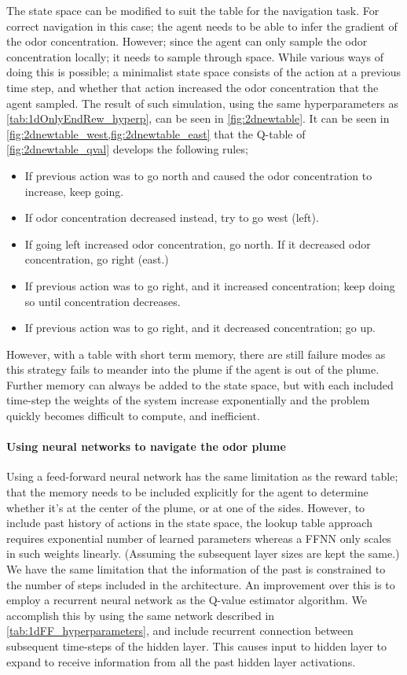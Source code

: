 \documentclass[../dissertation.tex]{subfiles}
\begin{document}
The state space can be modified to suit the table for the navigation task.
For correct navigation in this case; the agent needs to be able to infer the gradient of the odor concentration.
However; since the agent can only sample the odor concentration locally; it needs to sample through space.
While various ways of doing this is possible; a minimalist state space consists of the action at a previous time step, and whether that action increased the odor concentration that the agent sampled.
The result of such simulation, using the same hyperparameters as \cref{tab:1dOnlyEndRew_hyperp}, can be seen in \cref{fig:2dnewtable}.
It can be seen in \cref{fig:2dnewtable_west,fig:2dnewtable_east} that the Q-table of \cref{fig:2dnewtable_qval} develops the following rules;

\begin{itemize}
    \item If previous action was to go north and caused the odor concentration to increase, keep going.
    \item If odor concentration decreased instead, try to go west (left).
    \item If going left increased odor concentration, go north. If it decreased odor concentration, go right (east.)
    \item If previous action was to go right, and it increased concentration; keep doing so until concentration decreases.
    \item If previous action was to go right, and it decreased concentration; go up.
\end{itemize}

However, with a table with short term memory, there are still failure modes as this strategy fails to meander into the plume if the agent is out of the plume.
Further memory can always be added to the state space, but with each included time-step the weights of the system increase exponentially and the problem quickly becomes difficult to compute, and inefficient.

\paragraph{Using neural networks to navigate the odor plume} \label{par:nn_2dplume}

Using a feed-forward neural network has the same limitation as the reward table; that the memory needs to be included explicitly for the agent to determine whether it's at the center of the plume, or at one of the sides.
However, to include past history of actions in the state space, the lookup table approach requires exponential number of learned parameters whereas a FFNN only scales in such weights linearly.
(Assuming the subsequent layer sizes are kept the same.)
We have the same limitation that the information of the past is constrained to the number of steps included in the architecture.
An improvement over this is to employ a recurrent neural network as the Q-value estimator algorithm.
We accomplish this by using the same network described in \cref{tab:1dFF_hyperparameters}, and include recurrent connection between subsequent time-steps of the hidden layer.
This causes input to hidden layer to expand to receive information from all the past hidden layer activations.
\end{document}
